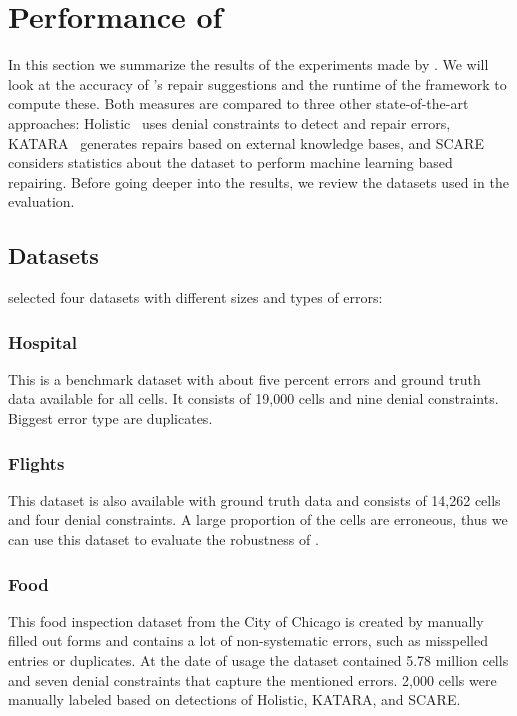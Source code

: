\section{Performance of \holoclean{}}\label{sec:performance}
  In this section we summarize the results of the experiments made by \citeauthor{holoclean}.
  We will look at the accuracy of \holoclean{}'s repair suggestions and the runtime of the framework to compute these.
  Both measures are compared to three other state-of-the-art approaches:
  Holistic~\cite{holistic} uses denial constraints to detect and repair errors,
  KATARA~\cite{katara} generates repairs based on external knowledge bases, and
  SCARE~\cite{scare} considers statistics about the dataset to perform machine learning based repairing.
  Before going deeper into the results, we review the datasets used in the evaluation.

  \subsection{Datasets}
  \citeauthor{holoclean} selected four datasets with different sizes and types of errors:

  \subsubsection*{Hospital}
  This is a benchmark dataset with about five percent errors and ground truth data available for all cells.
  It consists of 19,000 cells and nine denial constraints.
  Biggest error type are duplicates.

  \subsubsection*{Flights}
  This dataset is also available with ground truth data and consists of 14,262 cells and four denial constraints.
  A large proportion of the cells are erroneous, thus we can use this dataset to evaluate the robustness of \holoclean{}.

  \subsubsection*{Food}
  This food inspection dataset from the City of Chicago is created by manually filled out forms and contains a lot of non-systematic errors, such as misspelled entries or duplicates.
  At the date of usage the dataset contained 5.78 million cells and seven denial constraints that capture the mentioned errors.
  2,000 cells were manually labeled based on detections of Holistic, KATARA, and SCARE.

